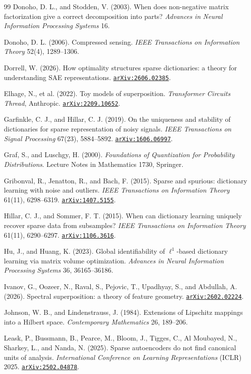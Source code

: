 \documentclass[11pt]{amsart}
\newcommand{\arxiv}[1]{\href{https://arxiv.org/abs/#1}{\texttt{arXiv:#1}}}
\theoremstyle{plain}
\theoremstyle{definition}
\begin{document}
\begin{thebibliography}{99}
 Donoho, D. L., and Stodden, V. (2003). When does non-negative matrix factorization give a correct decomposition into parts? \emph{Advances in Neural Information Processing Systems} 16.

 Donoho, D. L. (2006). Compressed sensing. \emph{IEEE Transactions on Information Theory} 52(4), 1289--1306.

 Dorrell, W. (2026). How optimality structures sparse dictionaries: a theory for understanding SAE representations. \arxiv{2606.02385}.

 Elhage, N., et al. (2022). Toy models of superposition. \emph{Transformer Circuits Thread}, Anthropic. \arxiv{2209.10652}.

 Garfinkle, C. J., and Hillar, C. J. (2019). On the uniqueness and stability of dictionaries for sparse representation of noisy signals. \emph{IEEE Transactions on Signal Processing} 67(23), 5884--5892. \arxiv{1606.06997}.

 Graf, S., and Luschgy, H. (2000). \emph{Foundations of Quantization for Probability Distributions}. Lecture Notes in Mathematics 1730, Springer.

 Gribonval, R., Jenatton, R., and Bach, F. (2015). Sparse and spurious: dictionary learning with noise and outliers. \emph{IEEE Transactions on Information Theory} 61(11), 6298--6319. \arxiv{1407.5155}.

 Hillar, C. J., and Sommer, F. T. (2015). When can dictionary learning uniquely recover sparse data from subsamples? \emph{IEEE Transactions on Information Theory} 61(11), 6290--6297. \arxiv{1106.3616}.

 Hu, J., and Huang, K. (2023). Global identifiability of $\ell^1$-based dictionary learning via matrix volume optimization. \emph{Advances in Neural Information Processing Systems} 36, 36165--36186.

 Ivanov, G., Oozeer, N., Raval, S., Pejovic, T., Upadhyay, S., and Abdullah, A. (2026). Spectral superposition: a theory of feature geometry. \arxiv{2602.02224}.

 Johnson, W. B., and Lindenstrauss, J. (1984). Extensions of Lipschitz mappings into a Hilbert space. \emph{Contemporary Mathematics} 26, 189--206.

 Leask, P., Bussmann, B., Pearce, M., Bloom, J., Tigges, C., Al Moubayed, N., Sharkey, L., and Nanda, N. (2025). Sparse autoencoders do not find canonical units of analysis. \emph{International Conference on Learning Representations} (ICLR) 2025. \arxiv{2502.04878}.


\end{thebibliography}
\end{document}
